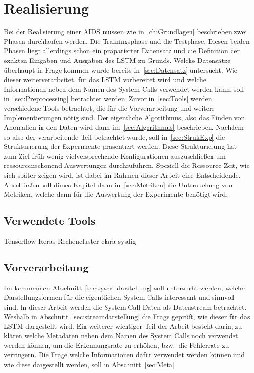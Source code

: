 
\chapter{Realisierung}\label{ch:Realisierung}
    Bei der Realisierung einer AIDS müssen wie in~\autoref{ch:Grundlagen} beschrieben zwei Phasen durchlaufen werden.
    Die Trainingsphase und die Testphase.
    Diesen beiden Phasen liegt allerdings schon ein präparierter Datensatz und die Definition der exakten Eingaben und Ausgaben des \ac{LSTM} zu Grunde. 
    Welche Datensätze überhaupt in Frage kommen wurde bereits in~\autoref{sec:Datensatz} untersucht.
    Wie dieser weiterverarbeitet, für das \ac{LSTM} vorbereitet wird und welche Informationen neben dem Namen des System Calls verwendet werden kann, 
    soll in~\autoref{sec:Preprocessing} betrachtet werden.
    Zuvor in~\autoref{sec:Tools} werden verschiedene Tools betrachtet, die für die Vorverarbeitung und weitere Implementierungen nötig sind.
    Der eigentliche Algorithmus, also das Finden von Anomalien in den Daten wird dann im~\autoref{sec:Algorithmus} beschrieben.
    Nachdem so also der verarbeitende Teil betrachtet wurde, soll in~\autoref{sec:StrukExp} die Strukturierung der Experimente präsentiert werden.
    Diese Strukturierung hat zum Ziel früh wenig vielversprechende Konfigurationen auszuschließen um ressourcenschonend Auswertungen durchzuführen.
    Speziell die Ressource Zeit, wie sich später zeigen wird, ist dabei im Rahmen dieser Arbeit eine Entscheidende.
    Abschließen soll dieses Kapitel dann in~\autoref{sec:Metriken} die Untersuchung von Metriken, welche dann für die Auswertung der Experimente benötigt wird.



    \section{Verwendete Tools}\label{sec:Tools}
        Tensorflow Keras
        Rechencluster clara
        sysdig

    \section{Vorverarbeitung}\label{sec:Preprocessing}
        Im kommenden Abschnitt~\ref{sec:syscalldarstellung} soll untersucht werden, welche Darstellungsformen für die eigentlichen System Calls interessant und sinnvoll sind.
        In dieser Arbeit werden die System Call Daten als Datenstream betrachtet.
        Weshalb in Abschnitt~\ref{sec:streamdarstellung} die Frage geprüft, wie dieser für das \ac{LSTM} dargestellt wird.
        Ein weiterer wichtiger Teil der Arbeit besteht darin, zu klären welche Metadaten neben dem Namen des System Calls noch verwendet werden können,
        um die Erkennungsrate zu erhöhen, bzw.\ die Fehlerrate zu verringern.
        Die Frage welche Informationen dafür verwendet werden können und wie diese dargestellt werden, soll in Abschnitt~\ref{sec:Meta}

